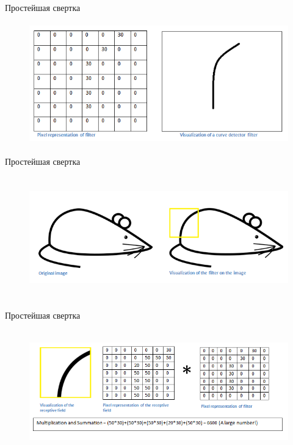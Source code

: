 \documentclass[10pt]{beamer}
\begin{document}
\begin{frame}{Простейшая свертка}
	\begin{figure}[htbp]
	  \includegraphics[height=150pt, width=\textwidth, keepaspectratio = true]{images/conv0}   
	\end{figure}
\end{frame}

\begin{frame}{Простейшая свертка}
	\begin{figure}[htbp]
	  \includegraphics[height=150pt, width=\textwidth, keepaspectratio = true]{images/conv2}   
	\end{figure}
\end{frame}

\begin{frame}{Простейшая свертка}
	\begin{figure}[htbp]
	  \includegraphics[height=150pt, width=\textwidth, keepaspectratio = true]{images/conv1}   
	\end{figure}
\end{frame}
\end{document}
